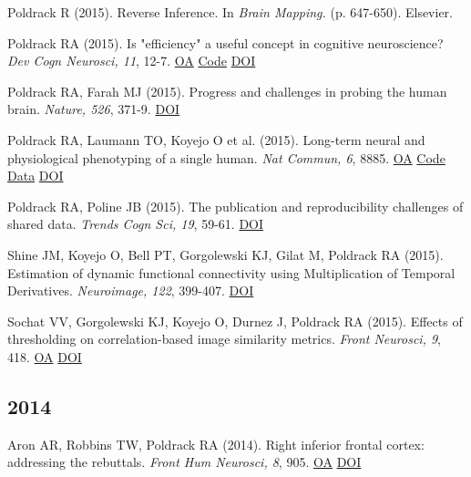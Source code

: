 \documentclass[10pt, letterpaper]{article}
\begin{document}
Poldrack R (2015). Reverse Inference. In \textit{Brain Mapping.} (p. 647-650). Elsevier. \vspace{2mm}

Poldrack RA (2015). Is "efficiency" a useful concept in cognitive neuroscience? \textit{Dev Cogn Neurosci, 11}, 12-7. \href{https://www.ncbi.nlm.nih.gov/pmc/articles/PMC6989750}{OA} \href{https://github.com/poldrack/rtmodel}{Code} \href{http://dx.doi.org/10.1016/j.dcn.2014.06.001}{DOI} \vspace{2mm}

Poldrack RA, Farah MJ (2015). Progress and challenges in probing the human brain. \textit{Nature, 526}, 371-9. \href{http://dx.doi.org/10.1038/nature15692}{DOI} \vspace{2mm}

Poldrack RA, Laumann TO, Koyejo O et al. (2015). Long-term neural and physiological phenotyping of a single human. \textit{Nat Commun, 6}, 8885. \href{https://www.ncbi.nlm.nih.gov/pmc/articles/PMC4682164}{OA} \href{https://github.com/poldrack/myconnectome}{Code} \href{https://openneuro.org/datasets/ds000031/versions/00001}{Data} \href{http://dx.doi.org/10.1038/ncomms9885}{DOI} \vspace{2mm}

Poldrack RA, Poline JB (2015). The publication and reproducibility challenges of shared data. \textit{Trends Cogn Sci, 19}, 59-61. \href{http://dx.doi.org/10.1016/j.tics.2014.11.008}{DOI} \vspace{2mm}

Shine JM, Koyejo O, Bell PT, Gorgolewski KJ, Gilat M, Poldrack RA (2015). Estimation of dynamic functional connectivity using Multiplication of Temporal Derivatives. \textit{Neuroimage, 122}, 399-407. \href{http://dx.doi.org/10.1016/j.neuroimage.2015.07.064}{DOI} \vspace{2mm}

Sochat VV, Gorgolewski KJ, Koyejo O, Durnez J, Poldrack RA (2015). Effects of thresholding on correlation-based image similarity metrics. \textit{Front Neurosci, 9}, 418. \href{https://www.ncbi.nlm.nih.gov/pmc/articles/PMC4625081}{OA} \href{http://dx.doi.org/10.3389/fnins.2015.00418}{DOI} \vspace{2mm}

\subsection*{2014}Aron AR, Robbins TW, Poldrack RA (2014). Right inferior frontal cortex: addressing the rebuttals. \textit{Front Hum Neurosci, 8}, 905. \href{https://www.ncbi.nlm.nih.gov/pmc/articles/PMC4227507}{OA} \href{http://dx.doi.org/10.3389/fnhum.2014.00905}{DOI} \vspace{2mm}
\end{document}
